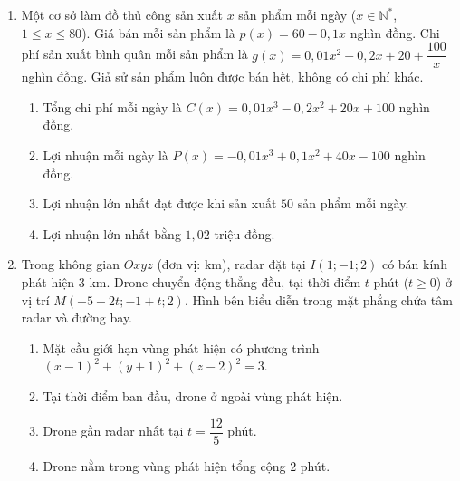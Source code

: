 \documentclass[12pt,a4paper]{article}
\begin{document}
\begin{enumerate}
\item Một cơ sở làm đồ thủ công sản xuất $x$ sản phẩm mỗi ngày ($x\in\mathbb N^*$, $1\leq x\leq80$). Giá bán mỗi sản phẩm là $p(x)=60-0{,}1x$ nghìn đồng. Chi phí sản xuất bình quân mỗi sản phẩm là $g(x)=0{,}01x^2-0{,}2x+20+\dfrac{100}{x}$ nghìn đồng. Giả sử sản phẩm luôn được bán hết, không có chi phí khác.
\begin{enumerate}[label=\alph*)]
\item Tổng chi phí mỗi ngày là $C(x)=0{,}01x^3-0{,}2x^2+20x+100$ nghìn đồng.
\item Lợi nhuận mỗi ngày là $P(x)=-0{,}01x^3+0{,}1x^2+40x-100$ nghìn đồng.
\item Lợi nhuận lớn nhất đạt được khi sản xuất $50$ sản phẩm mỗi ngày.
\item Lợi nhuận lớn nhất bằng $1{,}02$ triệu đồng.
\end{enumerate}
\item \begin{minipage}[t]{0.55\linewidth}
Trong không gian $Oxyz$ (đơn vị: km), radar đặt tại $I(1;-1;2)$ có bán kính phát hiện $3$ km. Drone chuyển động thẳng đều, tại thời điểm $t$ phút ($t\geq0$) ở vị trí $M(-5+2t;-1+t;2)$. Hình bên biểu diễn trong mặt phẳng chứa tâm radar và đường bay.
\begin{enumerate}[label=\alph*)]
\item Mặt cầu giới hạn vùng phát hiện có phương trình $(x-1)^2+(y+1)^2+(z-2)^2=3$.
\item Tại thời điểm ban đầu, drone ở ngoài vùng phát hiện.
\item Drone gần radar nhất tại $t=\dfrac{12}{5}$ phút.
\item Drone nằm trong vùng phát hiện tổng cộng $2$ phút.
\end{enumerate}
\end{minipage}\hfill
\begin{minipage}[t]{0.42\linewidth}\vspace{-0.4\baselineskip}\centering
{}
\end{minipage}
\end{enumerate}
\end{document}
